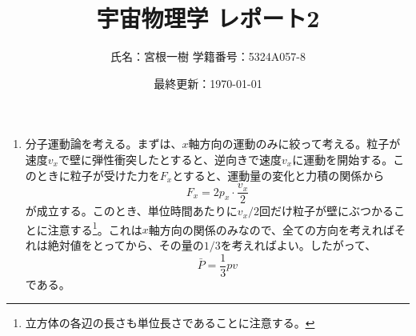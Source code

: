 \documentclass[unicode,a4paper,10pt]{ltjsarticle}
\begin{document}
\title{
  宇宙物理学
  \quad
  レポート2
}
\author{
  氏名：宮根一樹
  \quad
  学籍番号：5324A057-8
}
\date{最終更新：\today}

\maketitle

\begin{enumerate}
  \item
        分子運動論を考える。まずは、$x$軸方向の運動のみに絞って考える。粒子が速度$v_{x}$で壁に弾性衝突したとすると、逆向きで速度$v_{x}$に運動を開始する。このときに粒子が受けた力を$F_{x}$とすると、運動量の変化と力積の関係から
        \begin{equation}
          F_{x}
          =
          2p_{x}\cdot\frac{v_{x}}{2}
        \end{equation}
        が成立する。このとき、単位時間あたりに$v_{x}/2$回だけ粒子が壁にぶつかることに注意する\footnote{
          立方体の各辺の長さも単位長さであることに注意する。
        }。これは$x$軸方向の関係のみなので、全ての方向を考えればそれは絶対値をとってから、その量の$1/3$を考えればよい。したがって、
        \begin{equation}
          \bar{P}
          =
          \frac{1}{3}pv
        \end{equation}
        である。


\end{enumerate}
\end{document}

